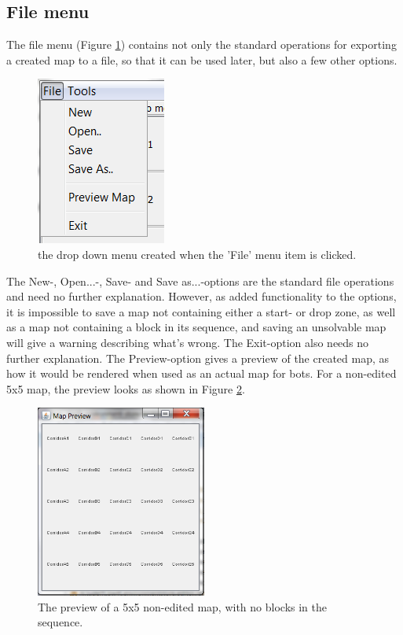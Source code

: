 \subsection{File menu}
The file menu (Figure \ref{fig:DropDownFile}) contains not only the standard operations for exporting a created map to a file, so that it can be used later, but also a few other options.

\begin{figure}[h!]
	\center
	\includegraphics{EnvironmentStore/DropDownFile.png}
	\caption{the drop down menu created when the 'File' menu item is clicked.}
	\label{fig:DropDownFile}
\end{figure}

The New-, Open...-, Save- and Save as...-options are the standard file operations and need no further explanation. However, as added functionality to the options, it is impossible to save a map not containing either a start- or drop zone, as well as a map not containing a block in its sequence, and saving an unsolvable map will give a warning describing what's wrong. The Exit-option also needs no further explanation. The Preview-option gives a preview of the created map, as how it would be rendered when used as an actual map for bots. For a non-edited 5x5 map, the preview looks as shown in Figure \ref{fig:Preview}.

\begin{figure}[h!]
	\center
	\includegraphics[width=0.5\textwidth]{EnvironmentStore/Preview.png}
	\caption{The preview of a 5x5 non-edited map, with no blocks in the sequence.}
	\label{fig:Preview}
\end{figure}


